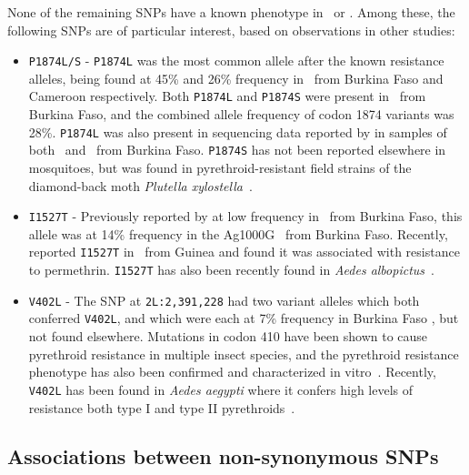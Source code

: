 \documentclass[a4paper,11pt,abstracton,hidelinks]{scrartcl}
\begin{document}
None of the remaining SNPs have a known phenotype in \agam\ or \acol.
%
Among these, the following SNPs are of particular interest, based on observations in other studies:
%
\begin{itemize}
    \item \texttt{P1874L/S} - \texttt{P1874L} was the most common allele after the known resistance alleles, being found at 45\% and 26\% frequency in \agam\ from Burkina Faso and Cameroon respectively.
    Both \texttt{P1874L} and \texttt{P1874S} were present in \acol\ from Burkina Faso, and the combined allele frequency of codon 1874 variants was 28\%.
    \texttt{P1874L} was also present in sequencing data reported by \textcite{Jones2012} in samples of both \agam\ and \acol\ from Burkina Faso.
    \texttt{P1874S} has not been reported elsewhere in mosquitoes, but was found in pyrethroid-resistant field strains of the diamond-back moth \textit{Plutella xylostella}~\parencite{Sonoda2010}.
    \item \texttt{I1527T} - Previously reported by \textcite{Jones2012} at low frequency in \acol\ from Burkina Faso, this allele was at 14\% frequency in the Ag1000G \acol\ from Burkina Faso.
    Recently, \textcite{Collins2019} reported \texttt{I1527T} in \agam\ from Guinea and found it was associated with resistance to permethrin.
    \texttt{I1527T} has also been recently found in \textit{Aedes albopictus}~\parencite{Auteri2018}.
    \item \texttt{V402L} - The SNP at \texttt{2L:2,391,228} had two variant alleles which both conferred \texttt{V402L}, and which were each at 7\% frequency in Burkina Faso \acol, but not found elsewhere.
    Mutations in codon 410 have been shown to cause pyrethroid resistance in multiple insect species, and the pyrethroid resistance phenotype has also been confirmed and characterized in vitro~\parencite{Dong2014}.
    Recently, \texttt{V402L} has been found in \textit{Aedes aegypti} where it confers high levels of resistance both type I and type II pyrethroids~\parencite{Haddi2017,VillanuevaSegura2020}.
\end{itemize}
%


\subsection{Associations between non-synonymous SNPs}\label{subsec:results-ld}
\end{document}
